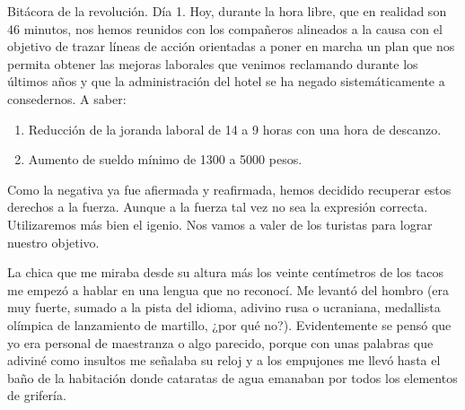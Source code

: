 \documentclass[11pt,twoside,openright,a6paper]{book}
\begin{document}
\vspace{0.5cm}
\hrulefill\hspace{0.2cm} \decofourleft\decofourright \hspace{0.2cm} \hrulefill
\vspace{0.5cm}

Bitácora de la revolución. Día 1. Hoy, durante la hora libre, que en
realidad son 46 minutos, nos hemos reunidos con los compañeros alineados
a la causa con el objetivo de trazar líneas de acción orientadas a poner
en marcha un plan que nos permita obtener las mejoras laborales que venimos
reclamando durante los últimos años y que la administración del hotel
se ha negado sistemáticamente a consedernos. A saber:

\begin{enumerate}
\item Reducción de la joranda laboral de 14 a 9 horas con una hora de descanzo.
\item Aumento de sueldo mínimo de 1300 a 5000 pesos.
\end{enumerate}

Como la negativa ya fue afiermada y reafirmada, hemos decidido recuperar
estos derechos a la fuerza. Aunque a la fuerza tal vez no sea la expresión
correcta. Utilizaremos más bien el igenio. Nos vamos a valer de los turistas
para lograr nuestro objetivo.


\vspace{0.5cm}
\hrulefill\hspace{0.2cm} \decofourleft\decofourright \hspace{0.2cm} \hrulefill
\vspace{0.5cm}

La chica que me miraba desde su altura más los veinte centímetros de
los tacos me empezó a hablar en una lengua que no reconocí. Me levantó
del hombro (era muy fuerte, sumado a la pista del idioma, adivino rusa o
ucraniana, medallista olímpica de lanzamiento de martillo, ¿por qué
no?). Evidentemente se pensó que yo era personal de maestranza o algo
parecido, porque con unas palabras que adiviné como insultos me señalaba
su reloj y a los empujones me llevó hasta el baño de la habitación donde
cataratas de agua emanaban por todos los elementos de grifería.


\vspace{0.5cm}
\hrulefill\hspace{0.2cm} \decofourleft\decofourright \hspace{0.2cm} \hrulefill
\vspace{0.5cm}
\end{document}
